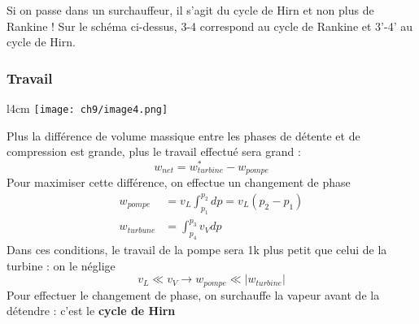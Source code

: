 	\danger Si on passe dans un surchauffeur, il s'agit du cycle de  Hirn et non 
	plus de Rankine ! Sur le schéma ci-dessus, 3-4 correspond au cycle de Rankine 
	et 3'-4' au cycle de Hirn.
	
		\subsubsection{Travail}
		\begin{wrapfigure}[8]{l}{4cm}
		\vspace{-5mm}
		\texttt{[image: ch9/image4.png]}
		\end{wrapfigure}
		Plus la différence de volume massique entre les phases de détente et de 
		compression est grande, plus le travail effectué sera grand :
		\begin{equation}
		w_{net} = w_{turbine}^* - w_{pompe}
		\end{equation}
		Pour maximiser cette différence, on effectue un changement de phase 
		\begin{equation}
		\begin{array}{ll}
		w_{pompe} &= v_L \int_{p_1}^{p_2} dp = v_L(p_2-p_1)\\
		w_{turbune} &= \int_{p_4}^{p_3} v_Vdp
		\end{array}
		\end{equation}
		Dans ces conditions, le travail de la pompe sera 1k plus petit que celui 
		de la turbine : on le néglige
		\begin{equation}
		v_L \ll v_V \rightarrow w_{pompe} \ll |w_{turbine}|
		\end{equation}
		Pour effectuer le changement de phase, on surchauffe la vapeur avant de 
		la détendre : c'est le \textbf{cycle de Hirn}
		
